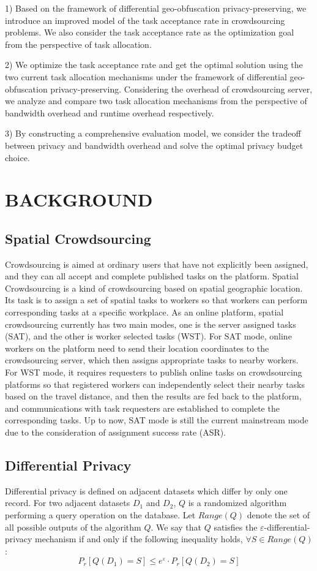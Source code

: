 1) Based on the framework of differential geo-obfuscation privacy-preserving, we introduce an improved model of the task acceptance rate in crowdsourcing problems. We also consider the task acceptance rate as the optimization goal from the perspective of task allocation.

2) We optimize the task acceptance rate and get the optimal solution using the two current task allocation mechanisms under the framework of differential geo-obfuscation privacy-preserving. Considering the overhead of crowdsourcing server, we analyze and compare two task allocation mechanisms from the perspective of bandwidth overhead and runtime overhead respectively.

3) By constructing a comprehensive evaluation model, we consider the tradeoff between privacy and bandwidth overhead and solve the optimal privacy budget choice.

\section{BACKGROUND}

\subsection{Spatial Crowdsourcing}
Crowdsourcing is aimed at ordinary users that have not explicitly been assigned, and they can all accept and complete published tasks on the platform. Spatial Crowdsourcing is a kind of crowdsourcing based on spatial geographic location. Its task is to assign a set of spatial tasks to workers so that workers can perform corresponding tasks at a specific workplace. As an online platform, spatial crowdsourcing currently has two main modes, one is the server assigned tasks (SAT), and the other is worker selected tasks (WST). For SAT mode, online workers on the platform need to send their location coordinates to the crowdsourcing server, which then assigns appropriate tasks to nearby workers. For WST mode, it requires requesters to publish online tasks on crowdsourcing platforms so that registered workers can independently select their nearby tasks based on the travel distance, and then the results are fed back to the platform, and communications with task requesters are established to complete the corresponding tasks. Up to now, SAT mode is still the current mainstream mode due to the consideration of assignment success rate (ASR).

\subsection{Differential Privacy}
\begin{definition}
	Differential privacy is defined on adjacent datasets which differ by only one record. For two adjacent datasets $D_1$ and $D_2$, $Q$ is a randomized algorithm performing a query operation on the database. Let $Range(Q)$ denote the set of all possible outputs of the algorithm $Q$. We say that $Q$ satisfies the $\varepsilon$-differential-privacy mechanism if and only if the following inequality holds, $\forall S \in Range(Q)$:
	$$
	P_r[Q(D_1)=S]\leq e^\varepsilon \cdot P_r [Q(D_2)=S]
	$$
\end{definition}

